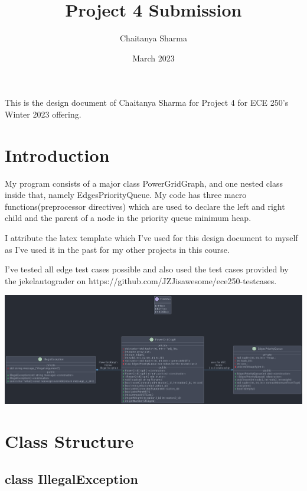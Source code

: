 \documentclass[a4paper]{article}
\title{Project 4 Submission}
\author{Chaitanya Sharma}
\date{March 2023}
\makeatletter
\renewenvironment{abstract}{%
    \if@twocolumn
      \section*{\abstractname}%
    \else 
      \begin{center}%
        {\bfseries \Large\abstractname\vspace{\z@}}
      \end{center}%
      \quotation
    \fi}
    {\if@twocolumn\else\endquotation\fi}
\makeatother
\begin{document}
\begin{center}
	\begin{abstract}
		This is the design document of Chaitanya Sharma for Project 4 for ECE 250's Winter 2023 offering.
	\end{abstract}
\end{center}


\section{Introduction}
	My program consists of a major class {\color{draculapurple}PowerGridGraph}, and one nested class inside that, namely {\color{draculapurple}EdgesPriorityQueue}.
	My code has three macro functions(preprocessor directives) which are used to declare the left and right child and the parent of a node in the priority queue minimum heap.

	I attribute the latex template which I've used for this design document to myself as I've used it in the past for my other projects in this course.

	I've tested all edge test cases possible and also used the test cases provided by the
	jekelautograder on {\color{DarkPastelBlue}https://github.com/JZJisawesome/ece250-testcases}.
\newline

\includegraphics[scale=0.145, center]{PowerGridGraph.png}

\section{Class Structure}
	\subsection{{\color{orange}class} {\Large{\color{draculapurple}IllegalException}}}
\end{document}
